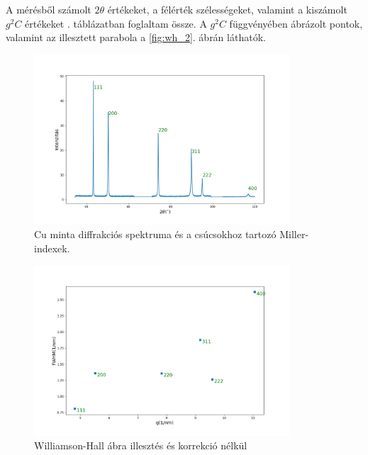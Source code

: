 \documentclass[12pt]{article}
\theoremstyle{plain}
\begin{document}
\vspace{.2cm}

\par A mérésből számolt $2\theta$ értékeket, a félérték szélességeket, valamint a kiszámolt $g^2C$ értékeket
. táblázatban foglaltam össze. A $g^2C$ függvényében ábrázolt pontok, valamint az illesztett
parabola a \ref{fig:wh_2}. ábrán láthatók.

\vspace{.2cm}

\begin{figure}[H]
	\begin{center}
		\includegraphics[width=0.85\textwidth]{./xray-lab/cuspectra.png}
		\caption{Cu minta diffrakciós spektruma és a csúcsokhoz tartozó Miller-indexek.}
	\end{center}
	\label{fig:cuspectra}
\end{figure}

\begin{figure}[H]
	\begin{center}
		\includegraphics[width=0.85\textwidth]{./xray-lab/wh1.png}
		\caption{Williamson-Hall ábra illesztés és korrekció nélkül}
	\end{center}
	\label{fig:wh_1}
\end{figure}
\end{document}
